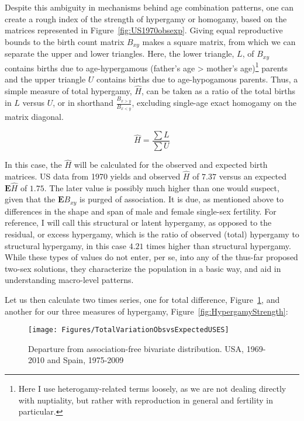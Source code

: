 Despite this ambiguity in mechanisms behind age combination patterns, one can
create a rough index of the strength of hypergamy or homogamy, based on the
matrices represented in Figure~\ref{fig:US1970obsexp}. Giving equal reproductive
bounds to the birth count matrix $B_{xy}$ makes a square matrix, from which we
can separate the upper and lower triangles. Here, the lower triangle, $L$,
of $B_{xy}$ contains births due to age-hypergamous (father's age > mother's
age)\footnote{Here I use heterogamy-related terms loosely, as we are not
dealing directly with nuptiality, but rather with reproduction in general and
fertility in particular.} parents and the upper triangle $U$ contains births due to
age-hypogamous parents. Thus, a simple measure of total hypergamy, $\widehat{H}$, can be taken as a ratio of the total births in $L$ versus $U$, or in shorthand $\frac{B_{x>y}}{B_{x<y}}$, excluding single-age exact homogamy on the matrix diagonal.

\begin{equation}
\widehat{H} = \frac{\sum L}{\sum U} 
\end{equation}

In this case, the $\widehat{H}$ will be calculated for the observed and expected
birth matrices. US data from 1970 yields and observed $\widehat{H}$ of $7.37$
versus an expected $\textbf{E}\widehat{H}$ of $1.75$. The later value is
possibly much higher than one would suspect, given that the $\textbf{E}B_{xy}$
is purged of association. It is due, as mentioned above to differences in the
shape and span of male and female single-sex fertility. For reference, I
will call this structural or latent hypergamy, as opposed to the residual, or
excess hypergamy, which is the ratio of observed (total) hypergamy to
structural hypergamy, in this case $4.21$ times higher
than structural hypergamy. While these types of values do not enter, per se, 
into any of the thus-far proposed two-sex solutions, they characterize the 
population in a basic way, and aid in understanding macro-level patterns. 

Let us then calculate two times series, one for total difference,
Figure~\ref{fig:Theta}, and another for our three measures of hypergamy,
Figure~\ref{fig:HypergamyStrength}:

\begin{figure}[!ht]
  \centering
    \caption{Departure from association-free bivariate distribution. USA,
    1969-2010 and Spain, 1975-2009}
     \texttt{[image: Figures/TotalVariationObsvsExpectedUSES]}
     \label{fig:Theta}
\end{figure}

